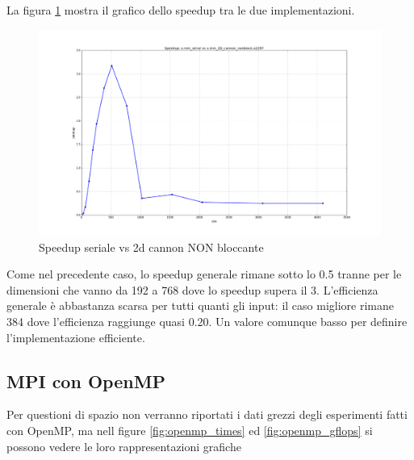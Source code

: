 La figura \ref{fig:speedup_serial_2d_cannon_nonblock} mostra il grafico dello speedup tra le due implementazioni.

\begin{figure}[htbp]
    \begin{center}
        \includegraphics[width=15cm]{immagini/speedup_serial_2d_cannon_nonblock.png}
    \end{center}
    \caption{Speedup seriale vs 2d cannon NON bloccante}
    \label{fig:speedup_serial_2d_cannon_nonblock}
\end{figure}

Come nel precedente caso, lo speedup generale rimane sotto lo 0.5 tranne per le dimensioni che vanno da 192 a 768 dove lo speedup supera il 3. L'efficienza generale \`{e} abbastanza scarsa per tutti quanti gli input: il caso migliore rimane 384 dove l'efficienza raggiunge quasi 0.20. Un valore comunque basso per definire l'implementazione efficiente.

\subsection{MPI con OpenMP}

Per questioni di spazio non verranno riportati i dati grezzi degli esperimenti fatti con OpenMP, ma nell figure \ref{fig:openmp_times} ed \ref{fig:openmp_gflops} si possono vedere le loro rappresentazioni grafiche

